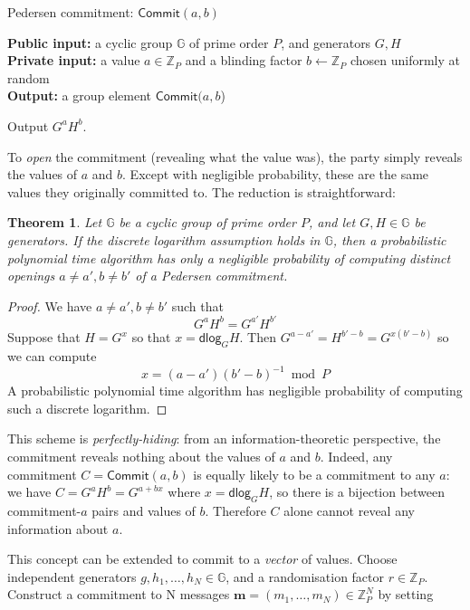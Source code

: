 \documentclass[12pt,a4paper]{article}
\newcommand{\commit}{\mathsf{Commit}}
\newcommand{\dlog}{\mathsf{dlog}}
\newtheorem{theorem}{Theorem}
\theoremstyle{definition}
\begin{document}
\begin{algorithm}\caption{Pedersen commitment: $\commit(a, b)$}\label{prot:Pedersen}
    \textbf{Public input:} a cyclic group $\mathbb{G}$ of prime order $P$, and generators $G, H$\\
    \textbf{Private input:} a value $a\in\mathbb{Z}_P$ and a blinding factor $b\gets\mathbb{Z}_P$ chosen uniformly at random\\
    \textbf{Output:} a group element $\commit(a, b$)
    \begin{algorithmic}[1]
        \State Output $G^a H^b$.
    \end{algorithmic}
\end{algorithm}
To \textit{open} the commitment (revealing what the value was), the party simply reveals the values of $a$ and $b$. Except with negligible probability, these are the same values they originally committed to. The reduction is straightforward:
\begin{theorem}
    Let $\mathbb{G}$ be a cyclic group of prime order $P$, and let $G, H \in \mathbb{G}$ be generators. If the discrete logarithm assumption holds in $\mathbb{G}$, then a probabilistic polynomial time algorithm has only a negligible probability of computing distinct openings $a\neq a', b\neq b'$ of a Pedersen commitment.
\end{theorem}
\begin{proof}
    We have $a\neq a', b\neq b'$ such that
    $$G^a H^b = G^{a'} H^{b'}$$
    Suppose that $H = G^x$ so that $x = \dlog_G H$. Then $G^{a-a'} = H^{b' - b} = G^{x(b' - b)}$ so we can compute
        $$x = (a - a')(b' - b)^{-1} \bmod P$$
    A probabilistic polynomial time algorithm has negligible probability of computing such a discrete logarithm.
\end{proof}
This scheme is \textit{perfectly-hiding}: from an information-theoretic perspective, the commitment reveals nothing about the values of $a$ and $b$. Indeed, any commitment $C = \commit(a, b)$ is equally likely to be a commitment to any $a$: we have $C = G^aH^b = G^{a + bx}$ where $x = \dlog_G H$, so there is a bijection between commitment-$a$ pairs and values of $b$. Therefore $C$ alone cannot reveal any information about $a$.

This concept can be extended to commit to a \textit{vector} of values. Choose independent generators $g, h_1, \ldots, h_N\in\mathbb{G}$, and a randomisation factor $r\in\mathbb{Z}_P$. Construct a commitment to N messages $\mathbf{m}=(m_1,\ldots,m_N)\in\mathbb{Z}_P^N$ by setting
\end{document}
